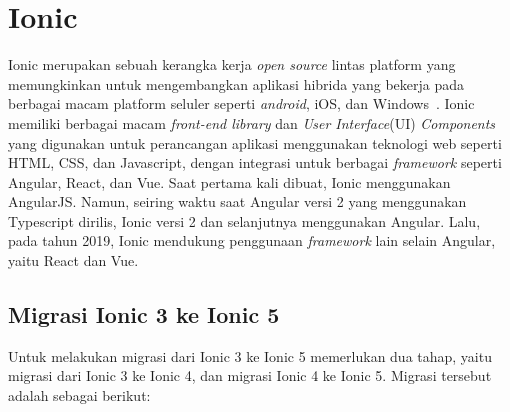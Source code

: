 \section{Ionic}
\label{sec:ionic} 
 
Ionic merupakan sebuah kerangka kerja {\it open source} lintas platform yang memungkinkan untuk mengembangkan aplikasi hibrida yang bekerja pada berbagai macam platform seluler seperti {\it android}, iOS, dan Windows~\cite{waranashiwar:18:ionic}. Ionic memiliki berbagai macam \textit{front-end library} dan \textit{User Interface}(UI) {\it Components} yang digunakan untuk  perancangan aplikasi menggunakan teknologi web seperti HTML, CSS, dan Javascript, dengan integrasi untuk berbagai \textit{framework} seperti Angular, React, dan Vue. Saat pertama kali dibuat, Ionic menggunakan AngularJS. Namun, seiring waktu saat Angular versi 2 yang menggunakan Typescript dirilis, Ionic versi 2 dan selanjutnya menggunakan Angular. Lalu, pada tahun 2019, Ionic mendukung penggunaan \textit{framework} lain selain Angular, yaitu React dan Vue.


\subsection{Migrasi Ionic 3 ke Ionic 5}
\label{subsec:migrasi}

Untuk melakukan migrasi dari Ionic 3 ke Ionic 5 memerlukan dua tahap, yaitu migrasi dari Ionic 3 ke Ionic 4, dan migrasi Ionic 4 ke Ionic 5. Migrasi tersebut adalah sebagai berikut:

